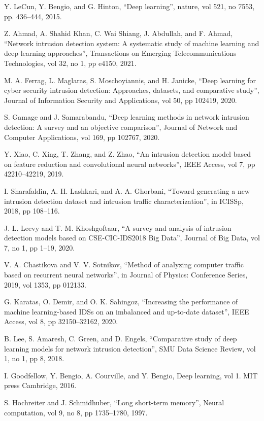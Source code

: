 \documentclass[conference]{IEEEtran}
\begin{document}
\begin{thebibliography}{00}
 Y. LeCun, Y. Bengio, and G. Hinton, “Deep learning”, nature, vol 521, no 7553, pp. 436–444, 2015.

 Z. Ahmad, A. Shahid Khan, C. Wai Shiang, J. Abdullah, and F. Ahmad, “Network intrusion detection system: A systematic study of machine learning and deep learning approaches”, Transactions on Emerging Telecommunications Technologies, vol 32, no 1, pp e4150, 2021.

 M. A. Ferrag, L. Maglaras, S. Moschoyiannis, and H. Janicke, “Deep learning for cyber security intrusion detection: Approaches, datasets, and comparative study”, Journal of Information Security and Applications, vol 50, pp 102419, 2020.

 S. Gamage and J. Samarabandu, “Deep learning methods in network intrusion detection: A survey and an objective comparison”, Journal of Network and Computer Applications, vol 169, pp 102767, 2020.

 Y. Xiao, C. Xing, T. Zhang, and Z. Zhao, “An intrusion detection model based on feature reduction and convolutional neural networks”, IEEE Access, vol 7, pp 42210–42219, 2019.

 I. Sharafaldin, A. H. Lashkari, and A. A. Ghorbani, “Toward generating a new intrusion detection dataset and intrusion traffic characterization”, in ICISSp, 2018, pp 108–116.

 J. L. Leevy and T. M. Khoshgoftaar, “A survey and analysis of intrusion detection models based on CSE-CIC-IDS2018 Big Data”, Journal of Big Data, vol 7, no 1, pp 1–19, 2020.

 V. A. Chastikova and V. V. Sotnikov, “Method of analyzing computer traffic based on recurrent neural networks”, in Journal of Physics: Conference Series, 2019, vol 1353, pp 012133.

 G. Karatas, O. Demir, and O. K. Sahingoz, “Increasing the performance of machine learning-based IDSs on an imbalanced and up-to-date dataset”, IEEE Access, vol 8, pp 32150–32162, 2020.

 B. Lee, S. Amaresh, C. Green, and D. Engels, “Comparative study of deep learning models for network intrusion detection”, SMU Data Science Review, vol 1, no 1, pp 8, 2018.

I. Goodfellow, Y. Bengio, A. Courville, and Y. Bengio, Deep learning, vol 1. MIT press Cambridge, 2016.

 S. Hochreiter and J. Schmidhuber, “Long short-term memory”, Neural computation, vol 9, no 8, pp 1735–1780, 1997.


\end{thebibliography}
\end{document}
